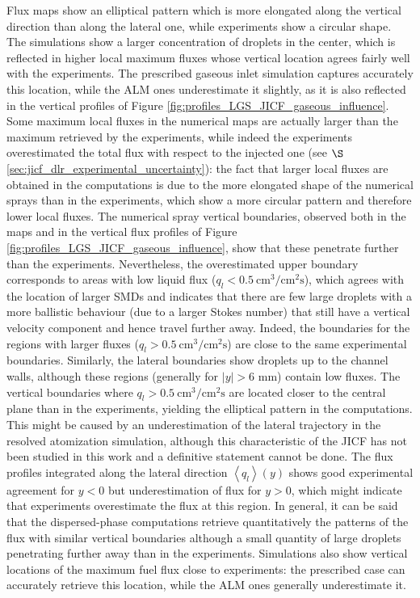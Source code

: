 Flux maps show an elliptical pattern which is more elongated along the vertical direction than along the lateral one, while experiments show a circular shape. The simulations show a larger concentration of droplets in the center, which is reflected in higher local maximum fluxes whose vertical location agrees fairly well with the experiments. The prescribed gaseous inlet simulation captures accurately this location, while the ALM ones underestimate it slightly, as it is also reflected in the vertical profiles of Figure \ref{fig:profiles_LGS_JICF_gaseous_influence}. Some maximum local fluxes in the numerical maps are actually larger than the maximum retrieved by the experiments, while indeed the experiments overestimated the total flux with respect to the injected one (see $\S$\ref{sec:jicf_dlr_experimental_uncertainty}): the fact that larger local fluxes are obtained in the computations is due to the more elongated shape of the numerical sprays than in the experiments, which show a more circular pattern and therefore lower local fluxes. The numerical spray vertical boundaries, observed both in the maps and in the vertical flux profiles of Figure \ref{fig:profiles_LGS_JICF_gaseous_influence}, show that these penetrate further than the experiments. Nevertheless, the overestimated upper boundary corresponds to areas with low liquid flux ($q_l < 0.5~\mathrm{cm}^3/\mathrm{cm}^2\mathrm{s}$), which agrees with the location of larger SMDs and indicates that there are few large droplets with a more ballistic behaviour (due to a larger Stokes number) that still have a vertical velocity component and hence travel further away. Indeed, the boundaries for the regions with larger fluxes ($q_l > 0.5~\mathrm{cm}^3/\mathrm{cm}^2\mathrm{s}$) are close to the same experimental boundaries. Similarly, the lateral boundaries show droplets up to the channel walls, although these regions (generally for $|y| > 6$ mm) contain low fluxes. The vertical boundaries where $q_l > 0.5~\mathrm{cm}^3/\mathrm{cm}^2\mathrm{s}$ are located closer to the central plane than in the experiments, yielding the elliptical pattern in the computations. This might be caused by an underestimation of the lateral trajectory in the resolved atomization simulation, although this characteristic of the JICF has not been studied in this work and a definitive statement cannot be done. The flux profiles integrated along the lateral  direction $\left\langle q_l \right\rangle \left( y \right)$ shows good experimental agreement for $y < 0$ but underestimation of flux for $y > 0$, which might indicate that experiments overestimate the flux at this region. In general, it can be said that the dispersed-phase computations retrieve quantitatively the patterns of the flux with similar vertical boundaries although a small quantity of large droplets penetrating further away than in the experiments. Simulations also show vertical locations of the maximum fuel flux close to experiments: the prescribed case can accurately retrieve this location, while the ALM ones generally underestimate it.


